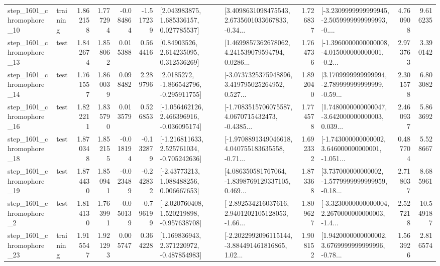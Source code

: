 \begin{tabular}{llrrrrllrlrr}
 step\_1601\_chromophore\_10 &  training &      1.862158 &    1.777294 &     -0.084864 & -1.517239 &     [2.043983875, 1.685336157, 0.027785537] &  [3.4098631098475543, 2.6735601033667833, -0.34... &       1.726837 &  [-3.2309999999999945, -2.5059999999999993, -0.... &            4.760908 &          9.616235 \\
 step\_1601\_chromophore\_13 &      test &      1.842674 &    1.858062 &      0.015388 &  0.564416 &      [0.84903526, 2.614235095, 0.312536269] &  [1.4699857362678062, 4.241539079594794, 0.0286... &       1.764736 &  [-1.3960000000000008, -4.015000000000001, -0.2... &            2.973763 &          3.390142 \\
 step\_1601\_chromophore\_14 &      test &      1.761557 &    1.860039 &      0.098482 &  2.289796 &     [2.0185272, -1.866542796, -0.295911755] &  [-3.0737325375948896, 3.419795025264952, 0.527... &       1.892040 &  [3.1709999999999994, -2.789999999999999, -0.59... &            2.301578 &          6.803082 \\
 step\_1601\_chromophore\_16 &      test &      1.822211 &    1.835790 &      0.013579 &  0.526853 &   [-1.056462126, 2.466396916, -0.036095174] &  [-1.7083515706075587, 4.0670715432473, -0.4385... &       1.774578 &  [1.7480000000000047, -3.642000000000003, 0.039... &            2.460937 &          5.863692 \\
 step\_1601\_chromophore\_18 &      test &      1.870348 &    1.852155 &     -0.018194 & -0.132879 &   [-1.216811633, 2.525761034, -0.705242636] &  [-1.9708891349046618, 4.040755183635558, -0.71... &       1.692332 &  [-1.743000000000002, 3.646000000000001, -1.051... &            0.487704 &          5.528667 \\
 step\_1601\_chromophore\_19 &      test &      1.874430 &    1.850941 &     -0.023489 & -0.242832 &     [-2.43773213, 1.088488256, 0.006667653] &  [4.086350581767064, -1.8398769129337105, 0.469... &       1.873368 &  [3.737000000000002, -1.5779999999999959, -0.18... &            2.718037 &          8.685961 \\
  step\_1601\_chromophore\_2 &      test &      1.814130 &    1.763991 &     -0.050139 & -0.796199 &   [-2.020760408, 1.520219898, -0.957638708] &  [-2.892534216037616, 2.9401202105128053, -1.66... &       1.809627 &  [-3.3230000000000004, 2.2670000000000003, -1.4... &            2.527218 &         10.549187 \\
 step\_1601\_chromophore\_23 &  training &      1.915547 &    1.921293 &      0.005747 &  0.364228 &    [1.169836943, 2.371220972, -0.487854983] &  [-2.2022992096115144, -3.884491461816865, 1.02... &       1.908152 &  [1.9420000000000002, 3.6769999999999996, -0.78... &            1.563926 &          2.816574 \\

\end{tabular}
